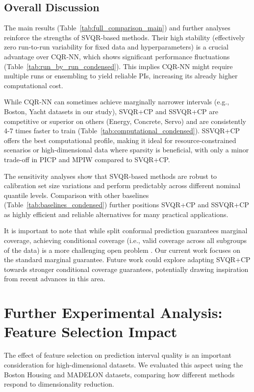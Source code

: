 \documentclass{article}
\begin{document}
\subsection{Overall Discussion}
The main results (Table~\ref{tab:full_comparison_main}) and further analyses reinforce the strengths of SVQR-based methods. Their high stability (effectively zero run-to-run variability for fixed data and hyperparameters) is a crucial advantage over CQR-NN, which shows significant performance fluctuations (Table~\ref{tab:run_by_run_condensed}). This implies CQR-NN might require multiple runs or ensembling to yield reliable PIs, increasing its already higher computational cost.

While CQR-NN can sometimes achieve marginally narrower intervals (e.g., Boston, Yacht datasets in our study), SVQR+CP and SSVQR+CP are competitive or superior on others (Energy, Concrete, Servo) and are consistently 4-7 times faster to train (Table~\ref{tab:computational_condensed}). SSVQR+CP offers the best computational profile, making it ideal for resource-constrained scenarios or high-dimensional data where sparsity is beneficial, with only a minor trade-off in PICP and MPIW compared to SVQR+CP.

The sensitivity analyses show that SVQR-based methods are robust to calibration set size variations and perform predictably across different nominal quantile levels. Comparison with other baselines (Table~\ref{tab:baselines_condensed}) further positions SVQR+CP and SSVQR+CP as highly efficient and reliable alternatives for many practical applications.

It is important to note that while split conformal prediction guarantees marginal coverage, achieving conditional coverage (i.e., valid coverage across all subgroups of the data) is a more challenging open problem \citep{Vovk2012ConditionalPI, Jung2023ConditionalCP}. Our current work focuses on the standard marginal guarantee. Future work could explore adapting SVQR+CP towards stronger conditional coverage guarantees, potentially drawing inspiration from recent advances in this area.

\section{Further Experimental Analysis: Feature Selection Impact}
\label{sec:feature_selection}

The effect of feature selection on prediction interval quality is an important consideration for high-dimensional datasets. We evaluated this aspect using the Boston Housing and MADELON datasets, comparing how different methods respond to dimensionality reduction.
\end{document}
